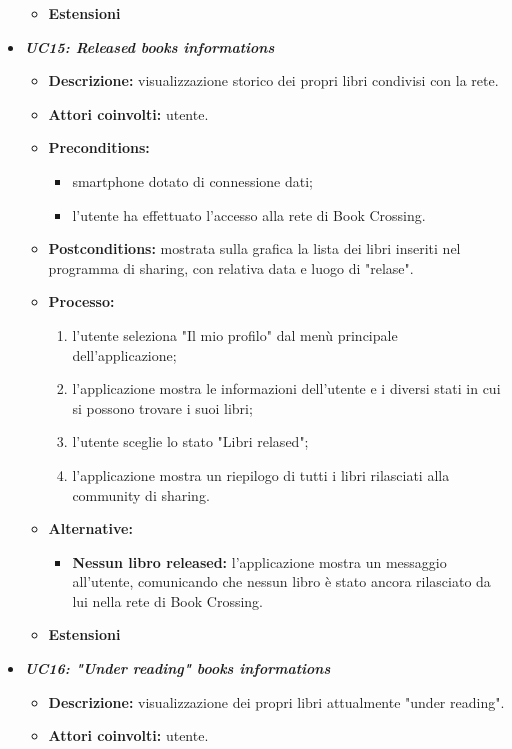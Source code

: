 \begin{itemize}
\begin{itemize}
		\item \textbf{Estensioni}
	\end{itemize}
	\item \textbf{\textit{UC15: Released books informations}}
	\begin{itemize}
		\item \textbf{Descrizione:} visualizzazione storico dei propri libri condivisi con la rete.
		\item \textbf{Attori coinvolti:}  utente.
		\item \textbf{Preconditions:}
		\begin{itemize}
			\item smartphone dotato di connessione dati;
			\item l’utente ha effettuato l’accesso alla rete di Book Crossing.
		\end{itemize}
		\item \textbf{Postconditions:} mostrata sulla grafica la lista dei libri inseriti nel programma di sharing, con relativa data e luogo di "relase".
		\item \textbf{Processo:}
		\begin{enumerate}
			\item l'utente seleziona "Il mio profilo" dal menù principale dell'applicazione;
			\item l'applicazione mostra le informazioni dell'utente e i diversi stati in cui si possono trovare i suoi libri;
			\item l'utente sceglie lo stato "Libri relased";
			\item l'applicazione mostra un riepilogo di tutti i libri rilasciati alla community di sharing.
		\end{enumerate}
		\item \textbf{Alternative:}
		\begin{itemize}
			\item \textbf{Nessun libro released:} l'applicazione mostra un messaggio all'utente, comunicando che nessun libro è stato ancora rilasciato da lui nella rete di Book Crossing.
		\end{itemize}
		\item \textbf{Estensioni}
	\end{itemize}
	\item \textbf{\textit{UC16: "Under reading" books informations}}
	\begin{itemize}
		\item \textbf{Descrizione:} visualizzazione dei propri libri attualmente "under reading".
		\item \textbf{Attori coinvolti:} utente.

\end{itemize}
\end{itemize}
